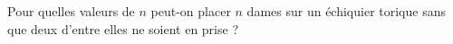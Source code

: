 Pour quelles valeurs de $n$ peut-on placer $n$ dames sur un échiquier torique sans que deux d'entre elles ne soient en prise ?
